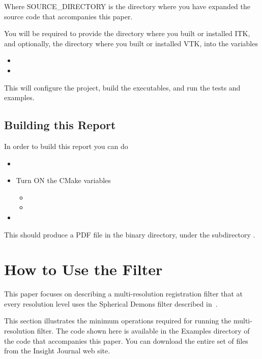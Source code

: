 \documentclass{InsightArticle}
\begin{document}
Where SOURCE\_DIRECTORY is the directory where you have expanded the source
code that accompanies this paper.

You will be required to provide the directory where you built or installed ITK,
and optionally, the directory where you built or installed VTK, into the variables

\begin{itemize}
\item {}
\item {}
\end{itemize}

This will configure the project, build the executables, and run the tests and
examples. 


\subsection{Building this Report}

In order to build this report you can do

\begin{itemize}
\item {}
\item Turn ON the CMake variables
\begin{itemize}
\item {}
\item {}
\end{itemize}
\item {}
\end{itemize}

This should produce a PDF file in the binary directory, under the subdirectory
.

\section{How to Use the Filter}

This paper focuses on describing a multi-resolution registration filter that at
every resolution level uses the Spherical Demons filter described
in~\cite{MeshDemonsRegistrationIJ2009}.

This section illustrates the minimum operations required for running the
multi-resolution filter.  The code shown here is available in the Examples
directory of the code that accompanies this paper. You can download the entire
set of files from the Insight Journal web site.
\end{document}
